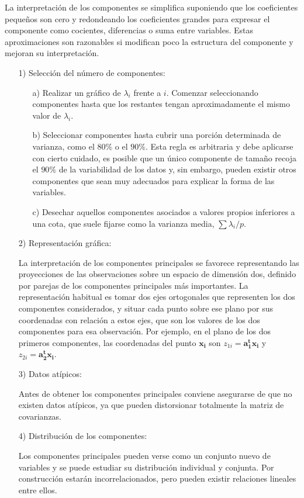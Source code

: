 \documentclass[12pt,letterpaper]{report} %
\begin{document}
La interpretación de los componentes se simplifica suponiendo que los coeficientes pequeños son cero y redondeando los coeficientes grandes para expresar el componente como cocientes, diferencias o suma entre variables. Estas aproximaciones son razonables si modifican poco la estructura del componente y mejoran su interpretación.
\begin{itemize}
\item [1)] Selección del número de componentes:
\begin{itemize}
	\item[a)] Realizar un gráfico de $\lambda_i$ frente a $i$. Comenzar seleccionando componentes hasta que los restantes tengan aproximadamente el mismo valor de $\lambda_i$.
	\item[b) ] Seleccionar componentes hasta cubrir una porción determinada de varianza, como el $80\%$ o el $90\%$. Esta regla es arbitraria y debe aplicarse con cierto cuidado, es posible que un único componente de tamaño recoja el $90\%$ de la variabilidad de los datos y, sin embargo, pueden existir otros componentes que sean muy adecuados para explicar la forma de las variables.
	\item[c) ] Desechar aquellos componentes asociados a valores propios inferiores a una cota, que suele fijarse como la varianza media, $\sum \lambda_i/p$.
\end{itemize}
\item [2)]  Representación gráfica:

La interpretación de los componentes principales se favorece representando las proyecciones de las observaciones sobre un espacio de dimensión dos, definido por parejas de los componentes principales más importantes. La representación habitual es tomar dos ejes ortogonales que representen los dos componentes considerados, y situar cada punto sobre ese plano por sus coordenadas con relación a estos ejes, que son los valores de los dos componentes para esa observación. Por ejemplo, en el plano de los dos primeros componentes, las coordenadas del punto $\mathbf{x_i}$ son $z_{1i}=\mathbf{a_1^tx_i}$ y $z_{2i}=\mathbf{a_2^tx_i}$.

\item [3)]  Datos atípicos:

Antes de obtener los componentes principales conviene asegurarse de que no existen datos atípicos, ya que pueden distorsionar totalmente la matriz de covarianzas.

\item [4)]  Distribución de los componentes:

Los componentes principales pueden verse como un conjunto nuevo de variables y se puede estudiar su distribución individual y conjunta. Por construcción estarán incorrelacionados, pero pueden existir relaciones lineales entre ellos.
\end{itemize}
\end{document}
